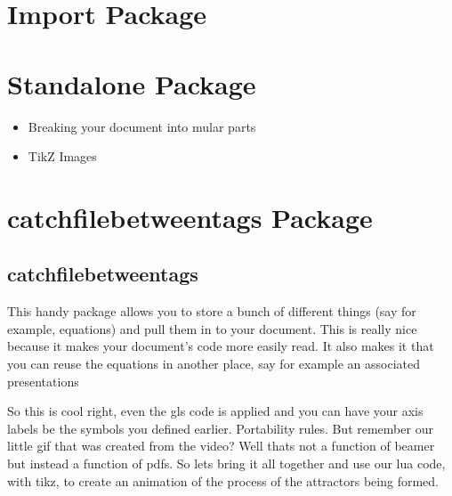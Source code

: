 \documentclass[hidelinks, float=false, crop=false]{standalone}
\begin{document}
    \section{Import Package}
    \section{Standalone Package}
        \begin{itemize}
            \item Breaking your document into mular parts
            \item TikZ Images
        \end{itemize}
    \section{catchfilebetweentags Package}
        \subsection{catchfilebetweentags}
            This handy package allows you to store a bunch of different things (say for example, equations) and pull them in to your document. This is really nice because it makes your document's code more easily read. It also makes it that you can reuse the equations in another place, say for example an associated presentations



            So this is cool right, even the gls code is applied and you can have your axis labels be the symbols you defined earlier. Portability rules.
            But remember our little gif that was created from the video? Well thats not a function of beamer but instead a function of pdfs. So lets bring it all together and use our lua code, with tikz, to create an animation of the process of the attractors being formed.


    \clearpage
    \standaloneBib
\end{document}
